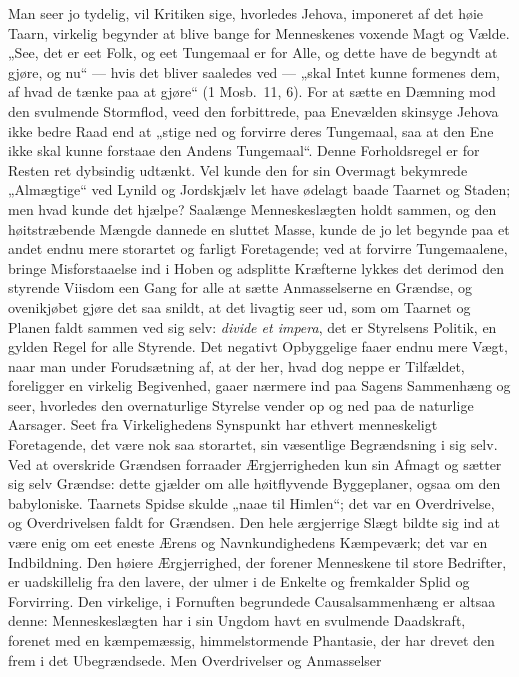 \documentclass[12pt]{book}
\begin{document}
Man seer jo tydelig, vil Kritiken sige, hvorledes Jehova, imponeret
af det høie Taarn, virkelig begynder at blive bange for Menneskenes
voxende Magt og Vælde. „See, det er eet Folk, og eet Tungemaal er
for Alle, og dette have de begyndt at gjøre, og nu“ --- hvis det
bliver saaledes ved --- „skal Intet kunne formenes dem, af hvad de
tænke paa at gjøre“ (1 Mosb.\ 11, 6). For at sætte en Dæmning mod
den svulmende Stormflod, veed den forbittrede, paa Enevælden
skinsyge Jehova ikke bedre Raad end at „stige ned og forvirre deres
Tungemaal, saa at den Ene ikke skal kunne forstaae den Andens
Tungemaal“. Denne Forholdsregel er for Resten ret dybsindig udtænkt.
Vel kunde den for sin Overmagt bekymrede „Almægtige“ ved Lynild og
Jordskjælv let have ødelagt baade Taarnet og Staden; men hvad kunde
det hjælpe? Saalænge Menneskeslægten holdt sammen, og den
høitstræbende Mængde dannede en sluttet Masse, kunde de jo let
begynde paa et andet endnu mere storartet og farligt Foretagende;
ved at forvirre Tungemaalene,
bringe Misforstaaelse ind i Hoben og adsplitte Kræfterne lykkes det
derimod den styrende Viisdom een Gang for alle at sætte
Anmasselserne en Grændse, og ovenikjøbet gjøre det saa snildt, at
det livagtig seer ud, som om Taarnet og Planen faldt sammen ved sig
selv: \textit{divide et impera}, det er Styrelsens Politik, en
gylden Regel for alle Styrende. Det negativt Opbyggelige faaer endnu
mere Vægt, naar man under Forudsætning af, at der her, hvad dog
neppe er Tilfældet, foreligger en virkelig Begivenhed, gaaer
nærmere ind paa Sagens Sammenhæng og seer, hvorledes den
overnaturlige Styrelse vender op og ned paa de naturlige Aarsager.
Seet fra Virkelighedens Synspunkt har ethvert menneskeligt
Foretagende, det være nok saa storartet, sin væsentlige Begrændsning
i sig selv. Ved at overskride Grændsen forraader Ærgjerrigheden kun
sin Afmagt og sætter sig selv Grændse: dette gjælder om alle
høitflyvende Byggeplaner, ogsaa om den babyloniske. Taarnets Spidse
skulde „naae til Himlen“; det var en Overdrivelse, og Overdrivelsen
faldt for Grændsen. Den hele ærgjerrige Slægt bildte sig ind at være
enig om eet eneste Ærens og Navnkundighedens Kæmpeværk; det var en
Indbildning. Den høiere Ærgjerrighed, der forener Menneskene til
store Bedrifter, er uadskillelig fra den lavere, der ulmer i de
Enkelte og fremkalder Splid og Forvirring. Den virkelige, i
Fornuften begrundede Causalsammenhæng er altsaa denne:
Menneskeslægten har i sin Ungdom havt en svulmende Daadskraft,
forenet med en kæmpemæssig, himmelstormende Phantasie, der har
drevet den frem i det Ubegrændsede. Men Overdrivelser og Anmasselser
\end{document}

